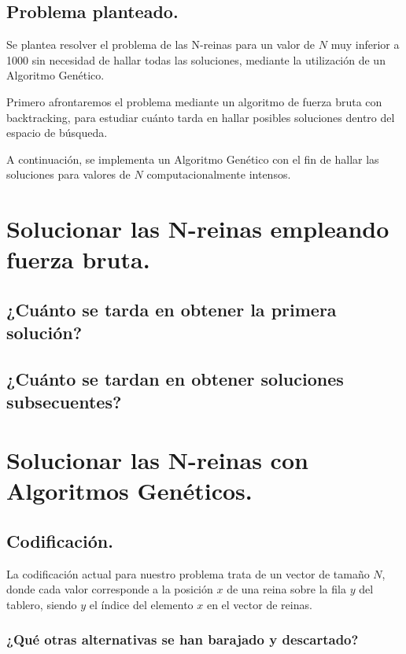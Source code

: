 \documentclass[12pt]{article}
\begin{document}
\subsection{Problema planteado.}
Se plantea resolver el problema de las N-reinas para un valor de $N$ muy inferior a 1000 sin necesidad de hallar todas las soluciones, mediante la utilización de un Algoritmo Genético.

Primero afrontaremos el problema mediante un algoritmo de fuerza bruta con backtracking, para estudiar cuánto tarda en hallar posibles soluciones dentro del espacio de búsqueda.

A continuación, se implementa un Algoritmo Genético con el fin de hallar las soluciones para valores de $N$ computacionalmente intensos.

\section{Solucionar las N-reinas empleando fuerza bruta.}

\subsection{¿Cuánto se tarda en obtener la primera solución?}

\subsection{¿Cuánto se tardan en obtener soluciones subsecuentes?}

\newpage
\section{Solucionar las N-reinas con Algoritmos Genéticos.}

\subsection{Codificación.}

La codificación actual para nuestro problema trata de un vector de tamaño $N$, donde cada valor corresponde a la posición $x$ de una reina sobre la fila $y$ del tablero, siendo $y$ el índice del elemento $x$ en el vector de reinas.

\subsubsection{¿Qué otras alternativas se han barajado y descartado?}
\end{document}
